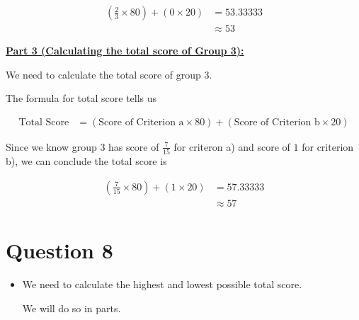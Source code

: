 \documentclass[12pt]{article}
\begin{document}
\begin{mdframed}
    \color{red}
    \setcounter{equation}{0}
    \begin{align}
        (\frac{2}{3} \times 80) + (0 \times 20) &= 53.33333\\
        &\approx 53
    \end{align}
    \color{black}

    \underline{\textbf{Part 3 (Calculating the total score of Group 3):}}

    \bigskip

    We need to calculate the total score of group 3.

    \bigskip

    \color{red}
    The formula for total score tells us

    \begin{align}
        \text{Total Score} &= (\text{Score of Criterion a} \times 80) + (\text{Score of Criterion b} \times 20)
    \end{align}
    \color{black}

    \bigskip

    Since we know \color{red}group 3 has score of $\frac{7}{15}$ for criteron a) and score of $1$ for
    criterion b)\color{black}, we can conclude the total score is

    \color{red}
    \setcounter{equation}{0}
    \begin{align}
        (\frac{7}{15} \times 80) + (1 \times 20) &= 57.33333\\
        &\approx 57
    \end{align}
    \color{black}

\end{mdframed}

\section*{Question 8}
\begin{itemize}
    \item

    We need to calculate the highest and lowest possible total score.

    \bigskip

    We will do so in parts.

    \bigskip


\end{itemize}

\bigskip
\end{document}
